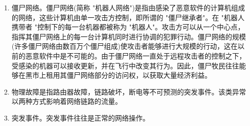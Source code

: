 \begin{enumerate}
    \item 僵尸网络。僵尸网络(简称 "机器人网络")是指由感染了恶意软件的计算机组成的网络，这些计算机由单一攻击方控制，即所谓的 "僵尸继承者"。在 "机器人携带者 "控制下的每一台机器都被称为 "机器人"。攻击方可以从一个中心点，指挥其僵尸网络上的每一台计算机同时进行协调的犯罪行动。僵尸网络的规模(许多僵尸网络由数百万个僵尸组成)使攻击者能够进行大规模的行动，这在以前的恶意软件中是不可能的。由于僵尸网络一直处于远程攻击者的控制之下，受感染的机器可以接收更新，并在飞行中改变其行为。因此，僵尸牧民往往能够在黑市上租用其僵尸网络部分的访问权，以获取大量经济利益。
    
    \item 物理故障是指路由器故障，链路破坏，断电等不可预测的突发事件。该类异常以两种方式影响着网络链路的流量。
    
    \item 突发事件。突发事件往往是正常的网络操作。
\end{enumerate}










